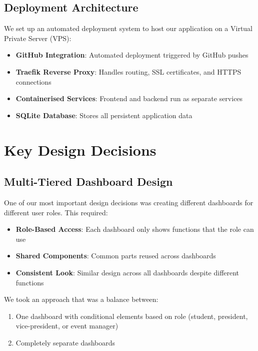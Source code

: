 \subsection{Deployment Architecture}

We set up an automated deployment system to host our application on a Virtual Private Server (VPS):

\begin{itemize}
    \item \textbf{GitHub Integration}: Automated deployment triggered by GitHub pushes
    \item \textbf{Traefik Reverse Proxy}: Handles routing, SSL certificates, and HTTPS connections
    \item \textbf{Containerised Services}: Frontend and backend run as separate services
    \item \textbf{SQLite Database}: Stores all persistent application data
\end{itemize}

\section{Key Design Decisions}

\subsection{Multi-Tiered Dashboard Design}

One of our most important design decisions was creating different dashboards for different user roles. This required:

\begin{itemize}
    \item \textbf{Role-Based Access}: Each dashboard only shows functions that the role can use
    \item \textbf{Shared Components}: Common parts reused across dashboards
    \item \textbf{Consistent Look}: Similar design across all dashboards despite different functions
\end{itemize}

We took an approach that was a balance between:

\begin{enumerate}
    \item One dashboard with conditional elements based on role (student, president, vice-president, or event manager)
    \item Completely separate dashboards
\end{enumerate}

